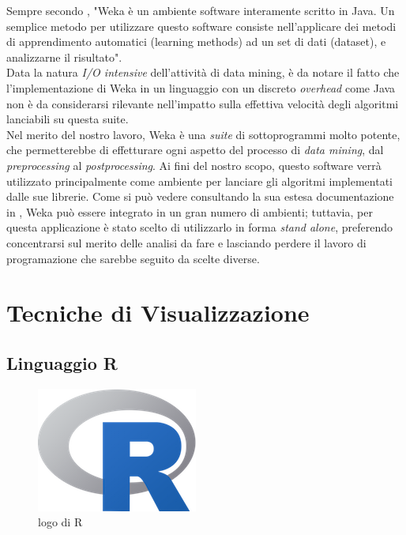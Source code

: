    Sempre secondo \cite{wekawiki}, "Weka è un ambiente software interamente scritto in Java. Un semplice metodo per utilizzare questo software consiste nell'applicare dei metodi di apprendimento automatici (learning methods) ad un set di dati (dataset), e analizzarne il risultato". \\

    Data la natura \textit{I/O intensive} dell'attività di data mining, è da notare il fatto che l'implementazione di Weka in un linguaggio con un discreto \textit{overhead} come Java non è da considerarsi rilevante nell'impatto sulla effettiva velocità degli algoritmi lanciabili su questa suite.\\

    Nel merito del nostro lavoro, Weka è una \textit{suite} di sottoprogrammi molto potente, che permetterebbe di effetturare ogni aspetto del processo di \textit{data mining}, dal \textit{preprocessing} al \textit{postprocessing}. Ai fini del nostro scopo, questo software verrà utilizzato principalmente come ambiente per lanciare gli algoritmi implementati dalle sue librerie. Come si può vedere consultando la sua estesa documentazione in \cite{weka}, Weka può essere integrato in un gran numero di ambienti; tuttavia, per questa applicazione è stato scelto di utilizzarlo in forma \textit{stand alone}, preferendo concentrarsi sul merito delle analisi da fare e lasciando perdere il lavoro di programazione che sarebbe seguito da scelte diverse.\\


\section{Tecniche di Visualizzazione}

    \subsection{Linguaggio R}

        \begin{figure}
            \centering
            \caption{logo di R}
            \label{R}
    	    \includegraphics[scale=0.75]{img/R.png}
        \end{figure}

